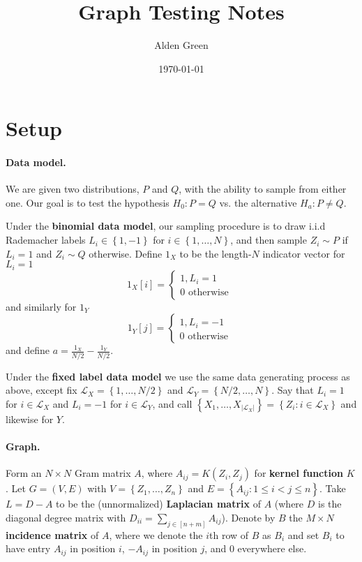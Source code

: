 \documentclass{article}
\newcommand{\abs}[1]{\left \lvert #1 \right \rvert}
\newcommand{\set}[1]{\left\{#1\right\}}
\newcommand{\Lx}{\mathcal{L}_X}
\theoremstyle{alden}
\theoremstyle{definition}
\theoremstyle{remark}
\begin{document}
	
\title{Graph Testing Notes}
\author{Alden Green}
\date{\today}
\maketitle

\section{Setup}

\paragraph{Data model.}

We are given two distributions, $P$ and $Q$, with the ability to sample from either one. Our goal is to test the hypothesis $H_0: P = Q$ vs. the alternative $H_a: P \neq Q$. 

Under the \textbf{binomial data model}, our sampling procedure is to draw i.i.d Rademacher labels $L_i \in \set{1, -1}$ for $i \in \set{1, \ldots, N}$, and then sample 
$Z_i \sim P$ if $L_i = 1$ and $Z_i \sim Q$ otherwise. Define $1_X$ to be the length-$N$ indicator vector for $L_i = 1$
\begin{equation*}
1_X[i] = 
\begin{cases}
1, L_i = 1\\
0 \text{ otherwise } 
\end{cases}
\end{equation*}
and similarly for $1_Y$
\begin{equation*}
1_Y[j] = 
\begin{cases}
1, L_i= -1 \\
0 \text{ otherwise } 
\end{cases}
\end{equation*}
and define $a = \frac{1_X}{N / 2} - \frac{1_Y}{N / 2}$. 

Under the \textbf{fixed label data model} we use the same data generating process as above, except fix $\mathcal{L}_X = \set{1, \ldots, N/2}$ and $\mathcal{L}_Y = \set{N/2, \ldots, N}$. Say that $L_i = 1$ for $i \in \mathcal{L}_X$ and $L_i = -1$ for $i \in \mathcal{L}_Y$, and call $\set{ X_1, \ldots, X_{\abs{\Lx}} } = \set{Z_i: i \in \mathcal{L}_X}$ and likewise for $Y$.

\paragraph{Graph.}

Form an $N \times N$ Gram matrix $A$, where $A_{ij} = K(Z_i, Z_j)$ for \textbf{kernel function} $K$. Let $G = (V,E)$ with $V = \set{Z_1, \ldots, Z_n}$ and $E = \set{A_{ij}: 1 \leq i < j \leq n}$. Take $L = D - A$ to be the (unnormalized) \textbf{Laplacian matrix} of $A$ (where $D$ is the diagonal degree matrix with $D_{ii} = \sum_{j \in [n + m]} A_{ij}$). Denote by $B$ the $M \times N$ \textbf{incidence matrix} of $A$, where we denote the $i$th row of $B$ as $B_i$ and set $B_i$ to have entry $A_{ij}$ in position $i$, $-A_{ij}$ in position $j$, and $0$ everywhere else. 
\end{document}
